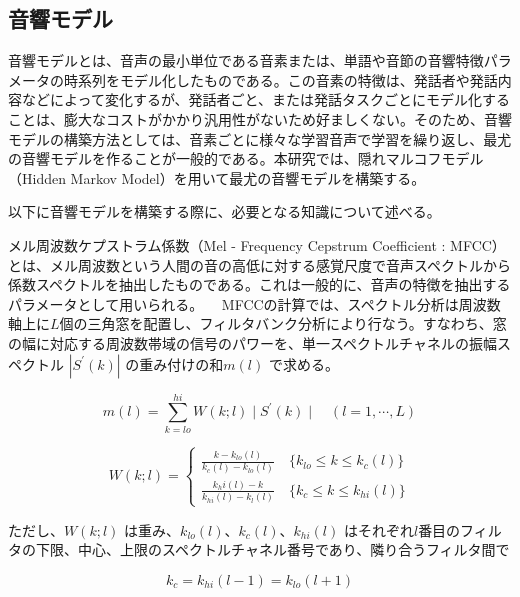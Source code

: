 \subsection{音響モデル}
\label{acoustic_model}
音響モデルとは、音声の最小単位である音素または、単語や音節の音響特徴パラメータの時系列をモデル化したものである。この音素の特徴は、発話者や発話内容などによって変化するが、発話者ごと、または発話タスクごとにモデル化することは、膨大なコストがかかり汎用性がないため好ましくない。そのため、音響モデルの構築方法としては、音素ごとに様々な学習音声で学習を繰り返し、最尤の音響モデルを作ることが一般的である。本研究では、隠れマルコフモデル（Hidden Markov Model）を用いて最尤の音響モデルを構築する。\par
以下に音響モデルを構築する際に、必要となる知識について述べる。\vspace{0.2in}

\par
メル周波数ケプストラム係数（Mel - Frequency Cepstrum Coefficient : MFCC）とは、メル周波数という人間の音の高低に対する感覚尺度で音声スペクトルから係数スペクトルを抽出したものである\cite{sp_recognition_shikano}。これは一般的に、音声の特徴を抽出するパラメータとして用いられる。
　MFCCの計算では、スペクトル分析は周波数軸上に$L$個の三角窓を配置し、フィルタバンク分析により行なう。すなわち、窓の幅に対応する周波数帯域の信号のパワーを、単一スペクトルチャネルの振幅スペクトル $|S^\prime (k)|$ の重み付けの和$m(l)$ で求める。

\begin{equation}
m(l)=\sum_{k=lo}^{hi}W(k;l)\mid S^\prime(k)\mid \quad (l=1,\cdots,L)
\end{equation}

\begin{equation}
W(k;l)=\begin{cases}\displaystyle\frac{k-k_{lo}(l)}{k_c(l)-k_{lo}(l)}\quad \{k_{lo}\leq k \leq k_c(l)\} \\ 
\displaystyle\frac{k_hi(l)-k}{k_{hi}(l)-k_{l}(l)}\quad \{k_{c}\leq k \leq k_{hi}(l)\} \end{cases}
\end{equation}

ただし、$W(k;l)$ は重み、$k_{lo}(l)、k_c(l)、k_{hi}(l)$ はそれぞれ$l$番目のフィルタの下限、中心、上限のスペクトルチャネル番号であり、隣り合うフィルタ間で

\begin{equation}
k_c=k_{hi}(l-1)=k_{lo}(l+1)
\end{equation}

